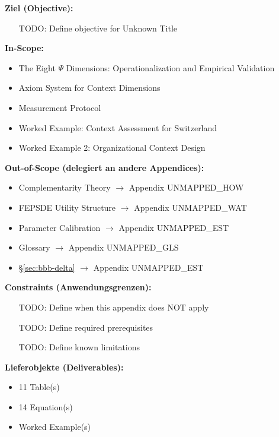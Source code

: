 
\begin{tcolorbox}[
    colback=orange!5!white,
    colframe=orange!75!black,
    title={\textbf{Appendix Scope: Ziel / In-Scope / Out-of-Scope / Constraints}},
    fonttitle=\bfseries
]

\textbf{Ziel (Objective):}
\begin{itemize}[nosep]
    \item [TODO: Define objective for Unknown Title]
\end{itemize}

\textbf{In-Scope:}
\begin{itemize}[nosep]
    \item The Eight $\Psi$ Dimensions: Operationalization and Empirical Validation
    \item Axiom System for Context Dimensions
    \item Measurement Protocol
    \item Worked Example: Context Assessment for Switzerland
    \item Worked Example 2: Organizational Context Design
\end{itemize}

\textbf{Out-of-Scope (delegiert an andere Appendices):}
\begin{itemize}[nosep]
    \item Complementarity Theory $\rightarrow$ Appendix UNMAPPED_HOW
    \item FEPSDE Utility Structure $\rightarrow$ Appendix UNMAPPED_WAT
    \item Parameter Calibration $\rightarrow$ Appendix UNMAPPED_EST
    \item Glossary $\rightarrow$ Appendix UNMAPPED_GLS
    \item \S\ref{sec:bbb-delta} $\rightarrow$ Appendix UNMAPPED_EST
\end{itemize}

\textbf{Constraints (Anwendungsgrenzen):}
\begin{itemize}[nosep]
    \item [TODO: Define when this appendix does NOT apply]
    \item [TODO: Define required prerequisites]
    \item [TODO: Define known limitations]
\end{itemize}

\textbf{Lieferobjekte (Deliverables):}
\begin{itemize}[nosep]
    \item 11 Table(s)
    \item 14 Equation(s)
    \item Worked Example(s)
\end{itemize}

\end{tcolorbox}


